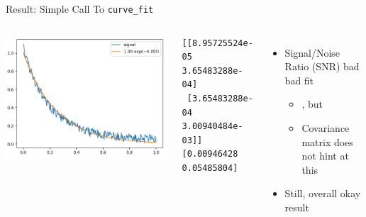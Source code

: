 
\begin{frame}[fragile]{Result: Simple Call To \texttt{curve\_fit}}
%
\begin{columns}
\includegraphics[width=\linewidth]{./gfx/05-simple-fit}
%
\begin{cmdbox}
\begin{verbatim}
[[8.95725524e-05 3.65483288e-04]
 [3.65483288e-04 3.00940484e-03]]
[0.00946428 0.05485804]
\end{verbatim}
\end{cmdbox}
%
\begin{itemize}
\item Signal/Noise Ratio (SNR) bad \Thus bad fit
	\vspace{-12pt}
	\begin{itemize}
	\item {}, but 
	\item Covariance matrix does not hint at this
	\end{itemize}
\item Still, overall okay result
\end{itemize}
\end{columns}
%
\end{frame}


